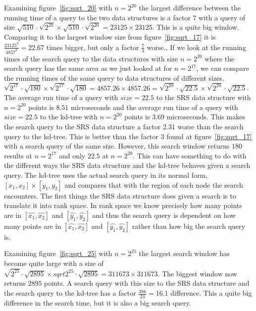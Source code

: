Examining figure~\ref{fig:sqrt_20} with $n = 2^{20}$ the largest difference between the running time of a query to the two data structures is a factor $7$ with a query of size $\sqrt{510}\cdot\sqrt{2^{20}} \times \sqrt{510}\cdot\sqrt{2^{20}} = 23125 \times 23125$. This is a quite big window. Comparing it to the largest window size from figure~\ref{fig:sqrt_17} it is $\frac{23125^2}{4857^2} = 22.67$ times bigger, but only a factor $\frac{7}{3}$ worse.. If we look at the running times of the search query to the data structures with size $n = 2^{20}$ where the search query has the same area as we just looked at for $n = 2^{17}$, we can compare the running times of the same query to data structures of different sizes. $\sqrt{2^{17}}\cdot\sqrt{180} \times \sqrt{2^{17}}\cdot\sqrt{180} = 4857.26 \times 4857.26 = \sqrt{2^{20}}\cdot\sqrt{22.5} \times \sqrt{2^{20}}\cdot\sqrt{22.5}$. The average run time of a query with $size = 22.5$ to the SRS data structure with $n = 2^{20}$ points is $8.51$ microseconds and the average run time of a query with $size = 22.5$ to the kd-tree with $n = 2^{20}$ points is $3.69$ microseconds. This makes the search query to the SRS data structure a factor $2.31$ worse than the search query to the kd-tree. This is better than the factor $3$ found at figure~\ref{fig:sqrt_17} with a search query of the same size. However, this search window returns $180$ results at $n = 2^{17}$ and only $22.5$ at $n = 2^{20}$. This can have something to do with the different ways the SRS data structure and the kd-tree behaves given a search query. The kd-tree uses the actual search query in its normal form, $[x_1, x_2] \times [y_1, y_2]$ and compares that with the region of each node the search encounters. The first things the SRS data structure does given a search is to translate it into rank space. In rank space we know precisely how many points are in $[\hat{x_1}, \hat{x_2}]$ and $[\hat{y_1}, \hat{y_2}]$ and thus the search query is dependent on how many points are in $[\hat{x_1}, \hat{x_2}]$ and $[\hat{y_1}, \hat{y_2}]$ rather than how big the search query is. 

Examining figure~\ref{fig:sqrt_25} with $n = 2^{25}$ the largest search window has become quite large with a size of $\sqrt{2^{25}}\cdot\sqrt{2895} \times sqrt{2^{25}}\cdot\sqrt{2895} = 311673 \times 311673$. The biggest window now returns $2895$ points. A search query with this size to the SRS data structure and the search query to the kd-tree has a factor $\frac{386}{24} = 16.1$ difference. This a quite big difference in the search time, but it is also a big search query. 


